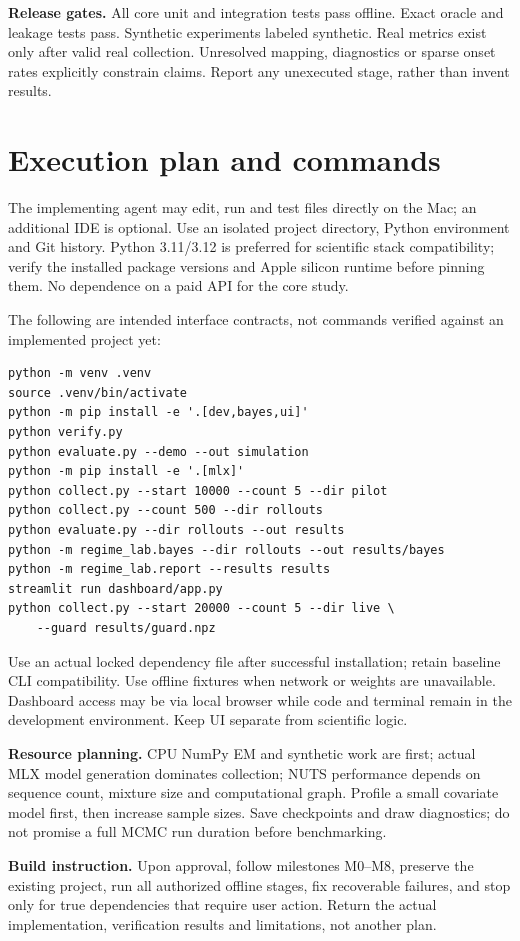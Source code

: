 \documentclass[11pt,letterpaper]{article}
\newcommand{\sectionpage}[1]{\clearpage\section{#1}}
\begin{document}
\textbf{Release gates.} All core unit and integration tests pass offline. Exact oracle and leakage tests pass. Synthetic experiments labeled synthetic. Real metrics exist only after valid real collection. Unresolved mapping, diagnostics or sparse onset rates explicitly constrain claims. Report any unexecuted stage, rather than invent results.

\sectionpage{Execution plan and commands}
The implementing agent may edit, run and test files directly on the Mac; an additional IDE is optional. Use an isolated project directory, Python environment and Git history. Python 3.11/3.12 is preferred for scientific stack compatibility; verify the installed package versions and Apple silicon runtime before pinning them. No dependence on a paid API for the core study.

The following are intended interface contracts, not commands verified against an implemented project yet:
\begin{verbatim}
python -m venv .venv
source .venv/bin/activate
python -m pip install -e '.[dev,bayes,ui]'
python verify.py
python evaluate.py --demo --out simulation
python -m pip install -e '.[mlx]'
python collect.py --start 10000 --count 5 --dir pilot
python collect.py --count 500 --dir rollouts
python evaluate.py --dir rollouts --out results
python -m regime_lab.bayes --dir rollouts --out results/bayes
python -m regime_lab.report --results results
streamlit run dashboard/app.py
python collect.py --start 20000 --count 5 --dir live \
    --guard results/guard.npz
\end{verbatim}
Use an actual locked dependency file after successful installation; retain baseline CLI compatibility. Use offline fixtures when network or weights are unavailable. Dashboard access may be via local browser while code and terminal remain in the development environment. Keep UI separate from scientific logic.

\textbf{Resource planning.} CPU NumPy EM and synthetic work are first; actual MLX model generation dominates collection; NUTS performance depends on sequence count, mixture size and computational graph. Profile a small covariate model first, then increase sample sizes. Save checkpoints and draw diagnostics; do not promise a full MCMC run duration before benchmarking.

\textbf{Build instruction.} Upon approval, follow milestones M0--M8, preserve the existing project, run all authorized offline stages, fix recoverable failures, and stop only for true dependencies that require user action. Return the actual implementation, verification results and limitations, not another plan.
\end{document}
